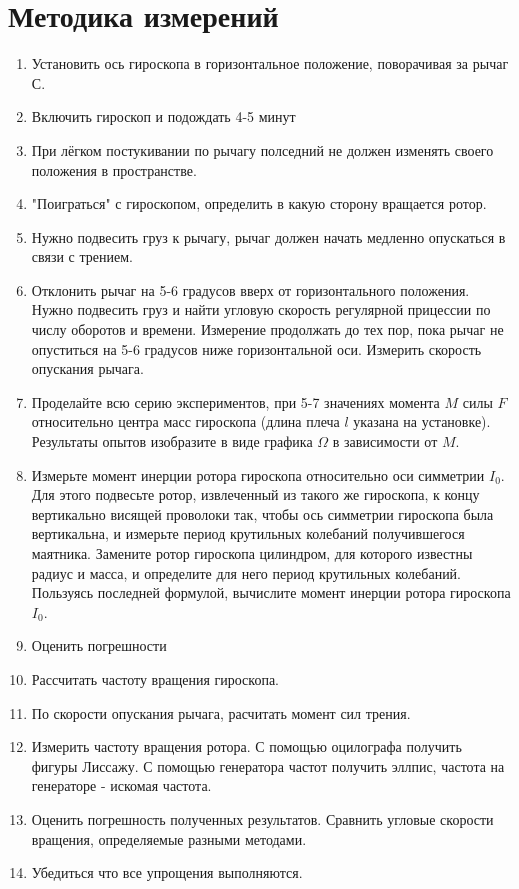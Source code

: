 \section{Методика измерений}
\begin{enumerate}
    \item Установить ось гироскопа в горизонтальное положение, поворачивая за рычаг С.
    \item Включить гироскоп и подождать 4-5 минут
    \item При лёгком постукивании по рычагу полседний не должен изменять своего положения в пространстве.
    \item "Поиграться" с гироскопом, определить в какую сторону вращается ротор.
    \item Нужно подвесить груз к рычагу, рычаг должен начать медленно опускаться в связи с трением.
    \item Отклонить рычаг на 5-6 градусов вверх от горизонтального положения. Нужно подвесить груз и найти угловую скорость регулярной прицессии по числу оборотов и времени. Измерение продолжать до тех пор, пока рычаг не опуститься на 5-6 градусов ниже горизонтальной оси. Измерить скорость опускания рычага.
    \item Проделайте всю серию экспериментов, при 5-7 значениях момента $M$ силы $F$ относительно центра масс гироскопа
    (длина плеча $l$ указана на установке). Результаты опытов изобразите в виде графика $\Omega$ в зависимости от $M$.
    \item Измерьте момент инерции ротора гироскопа относительно оси симметрии $I_0$. Для этого подвесьте ротор, извлеченный из такого же гироскопа, к концу вертикально висящей проволоки так, чтобы ось симметрии гироскопа была вертикальна, и измерьте период крутильных колебаний получившегося маятника. Замените ротор гироскопа цилиндром, для которого известны радиус и масса, и определите для него период крутильных колебаний. Пользуясь последней формулой, вычислите момент инерции ротора гироскопа $I_0$.
    \item Оценить погрешности
    \item Рассчитать частоту вращения гироскопа.
    \item По скорости опускания рычага, расчитать момент сил трения.
    \item Измерить частоту вращения ротора. С помощью оцилографа получить фигуры Лиссажу. С помощью генератора частот получить эллпис, частота на генераторе - искомая частота.
    \item Оценить погрешность полученных результатов. Сравнить угловые скорости вращения, определяемые разными методами.
    \item Убедиться что все упрощения выполняются.
\end{enumerate}